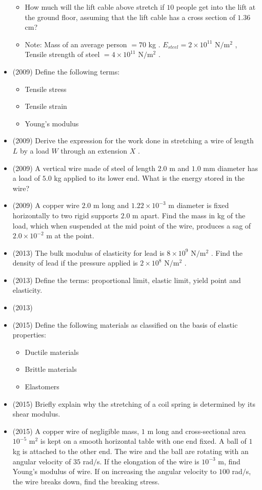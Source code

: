 \documentclass{article}
\begin{document}
\begin{itemize}
\begin{itemize}
\item How much will the lift cable above stretch if $ 10$ people get into the lift at the ground floor, assuming that the lift cable has a cross section of $ 1.36$ cm? 
\item Note: Mass of an average person $ =70$ kg . $ E_{steel}=2 \times 10^{11}$ N$/$m$^{2}$ , Tensile strength of steel $ =4 \times 10^{11}$ N$/$m$^{2}$ .
\end{itemize}
\item (2009)  Define the following terms:\begin{itemize}
\item Tensile stress
\item Tensile strain
\item Young’s modulus
\end{itemize}
\item (2009)  Derive the expression for the work done in stretching a wire of length $ L$ by a load $ W$ through an extension $ X$ .
\item (2009)  A vertical wire made of steel of length $ 2.0$ m and $ 1.0$ mm diameter has a load of $ 5.0$ kg applied to its lower end.  What is the energy stored in the wire?
\item (2009)  A copper wire $ 2.0$ m long and $ 1.22 \times 10^{-3}$ m diameter is fixed horizontally to two rigid supports $ 2.0$ m apart.  Find the mass in kg of the load, which when suspended at the mid point of the wire, produces a sag of $ 2.0 \times 10^{-2}$ m at the point.
\item (2013)  The bulk modulus of elasticity for lead is $ 8 \times 10^{9}$ N$/$m$ ^{2}$ . Find the density of lead if the pressure applied is $ 2 \times 10^{8}$ N$/$m$ ^{2}$ . 
\item (2013)  Define the terms: proportional limit, elastic limit, yield point and elasticity.
\item (2013)  \item (2015)  Define the following materials as classified on the basis of elastic properties:\begin{itemize}
\item  Ductile materials 
\item Brittle materials
\item Elastomers
\end{itemize}
\item (2015)  Briefly explain why the stretching of a coil spring is determined by its shear modulus.
\item (2015)  A copper wire of negligible mass, $ 1$ m long and cross-sectional area $ 10^{-5}$ m$ ^{2}$ is kept on a smooth horizontal table with one end fixed.  A ball of $ 1$ kg is attached to the other end.  The wire and the ball are rotating with an angular velocity of $ 35$ rad$/$s.  If the elongation of the wire is $ 10^{-3}$ m, find Young’s modulus of wire.  If on increasing the angular velocity to $ 100$ rad$/$s, the wire breaks down, find the breaking stress.

\end{itemize}
\end{document}
